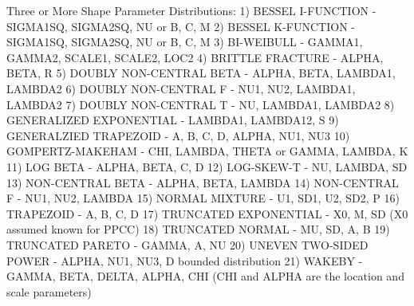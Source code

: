 Three or More Shape Parameter Distributions:
      1) BESSEL I-FUNCTION              - SIGMA1SQ, SIGMA2SQ, NU or
                                          B, C, M
      2) BESSEL K-FUNCTION              - SIGMA1SQ, SIGMA2SQ, NU or
                                          B, C, M
      3) BI-WEIBULL                     - GAMMA1, GAMMA2, SCALE1,
                                          SCALE2, LOC2
      4) BRITTLE FRACTURE               - ALPHA, BETA, R
      5) DOUBLY NON-CENTRAL BETA        - ALPHA, BETA, LAMBDA1, LAMBDA2
      6) DOUBLY NON-CENTRAL F           - NU1, NU2, LAMBDA1, LAMBDA2
      7) DOUBLY NON-CENTRAL T           - NU, LAMBDA1, LAMBDA2
      8) GENERALIZED EXPONENTIAL        - LAMBDA1, LAMBDA12, S
      9) GENERALZIED TRAPEZOID          - A, B, C, D, ALPHA, NU1, NU3
     10) GOMPERTZ-MAKEHAM               - CHI, LAMBDA, THETA or
                                          GAMMA, LAMBDA, K
     11) LOG BETA                       - ALPHA, BETA, C, D
     12) LOG-SKEW-T                     - NU, LAMBDA, SD
     13) NON-CENTRAL BETA               - ALPHA, BETA, LAMBDA
     14) NON-CENTRAL F                  - NU1, NU2, LAMBDA
     15) NORMAL MIXTURE                 - U1, SD1, U2, SD2, P
     16) TRAPEZOID                      - A, B, C, D
     17) TRUNCATED EXPONENTIAL          - X0, M, SD
                                          (X0 assumed known for PPCC)
     18) TRUNCATED NORMAL               - MU, SD, A, B
     19) TRUNCATED PARETO               - GAMMA, A, NU
     20) UNEVEN TWO-SIDED POWER         - ALPHA, NU1, NU3, D
                                          bounded distribution
     21) WAKEBY                         - GAMMA, BETA, DELTA, ALPHA, CHI
                                          (CHI and ALPHA are the location
                                          and scale parameters)

